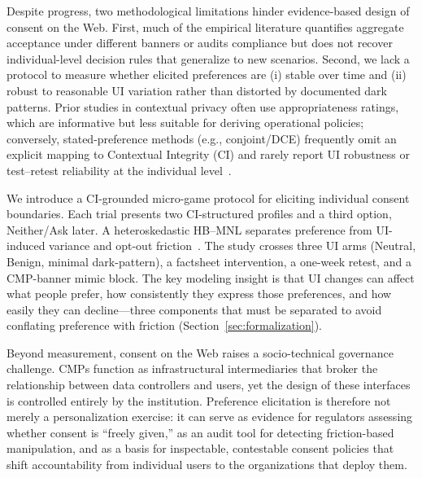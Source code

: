 \documentclass{eusset}
\begin{document}
Despite progress, two methodological limitations hinder evidence-based design of consent on the Web. First, much of the empirical literature quantifies aggregate acceptance under different banners or audits compliance but does not recover individual-level decision rules that generalize to new scenarios. Second, we lack a protocol to measure whether elicited preferences are (i) stable over time and (ii) robust to reasonable UI variation rather than distorted by documented dark patterns. Prior studies in contextual privacy often use appropriateness ratings, which are informative but less suitable for deriving operational policies; conversely, stated-preference methods (e.g., conjoint/DCE) frequently omit an explicit mapping to Contextual Integrity (CI) and rarely report UI robustness or test--retest reliability at the individual level~\citep{Hainmueller2014ConjointID,Train2009DCMS,de2022improving}.

We introduce a CI-grounded micro-game protocol for eliciting individual consent boundaries. Each trial presents two CI-structured profiles and a third option, Neither/Ask later. A heteroskedastic HB--MNL separates preference from UI-induced variance and opt-out friction~\citep{Train2009DCMS,Hainmueller2014ConjointID}. The study crosses three UI arms (Neutral, Benign, minimal dark-pattern), a factsheet intervention, a one-week retest, and a CMP-banner mimic block. The key modeling insight is that UI changes can affect what people prefer, how consistently they express those preferences, and how easily they can decline---three components that must be separated to avoid conflating preference with friction (Section~\ref{sec:formalization}).

Beyond measurement, consent on the Web raises a socio-technical governance challenge. CMPs function as infrastructural intermediaries that broker the relationship between data controllers and users, yet the design of these interfaces is controlled entirely by the institution. Preference elicitation is therefore not merely a personalization exercise: it can serve as evidence for regulators assessing whether consent is ``freely given,'' as an audit tool for detecting friction-based manipulation, and as a basis for inspectable, contestable consent policies that shift accountability from individual users to the organizations that deploy them.
\end{document}
